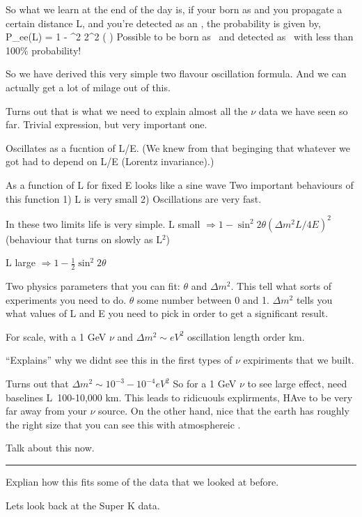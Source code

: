 {So what we learn at the end of the day is, if your born as \nue and you propagate a certain distance L, and you're detected as an \nue, the probability is given by,
\be 
P_{ee}(L) = 1 - \sin^2 2\theta \sin^2 \left(  \right)
\ee 
Possible to be born as \nue\ and detected as \nue\ with less than 100\% probability!

So we have derived this very simple two flavour oscillation formula.
And we can actually get a lot of milage out of this. 

Turns out that is what we need to explain almost all the $\nu$ data we have seen so far. 
Trivial expression, but very important one.

Oscillates as a fucntion of L/E. 
(We knew from that beginging that whatever we got had to depend on L/E (Lorentz invariance).)

As a function of L for fixed E looks like a sine wave
Two important behaviours of this function
1) L is very small
2) Oscillations are very fast. 

In these two limits life is very simple. 
L small  $\Rightarrow 1 - \sin^2 2\theta \left(\Delta m^2 L/4E\right)^2$  (behaviour that turns on slowly as L$^2$)

L large  $\Rightarrow 1 - \frac{1}{2}\sin^2 2\theta $  

Two physics parameters that you can fit: $\theta$ and  $\Delta m^2$.
This tell what sorts of experiments you need to do.
$\theta$ some number between 0 and 1. 
$\Delta m^2$ tells you what values of L and E you need to pick in order to get a significant result.

For scale, with a 1 GeV $\nu$ and $\Delta m^2 \sim eV^2$ oscillation length order km. 

``Explains'' why we didnt see this in the first types of $\nu$ expiriments that we built.  


Turns out that $\Delta m^2 \sim 10^{-3}-10^{-4}eV^2$
So for a 1 GeV $\nu$ to see large effect, need baselines L~100-10,000 km.  
This leads to ridicuouls explirments, HAve to be very far away from your $\nu$ source.  
On the other hand, nice that the earth has roughly the right size that you can see this with atmosphereic \nus. 

Talk about this now. 

\noindent\rule{\textwidth}{1pt}

Explian how this fits some of the data that we looked at before.

Lets look back at the Super K data. 

}
